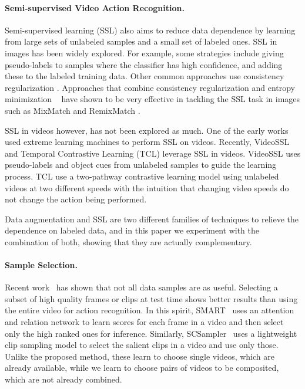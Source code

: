 \documentclass[runningheads]{llncs}
\begin{document}
 

\paragraph{Semi-supervised Video Action Recognition.} Semi-supervised learning (SSL) also aims to reduce data dependence by learning from large sets of unlabeled samples and a small set of labeled ones. SSL in images has been widely explored.
For example, some strategies include giving pseudo-labels \cite{arazo2020pseudo,pseudo} to samples where the classifier has high confidence, and adding these to the labeled training data. Other common approaches use consistency regularization \cite{conreg1,conreg2,meanteacher}. Approaches that combine consistency regularization and entropy minimization ~\cite{grandvalet2005semi} have shown to be very effective in tackling the SSL task in images such as MixMatch \cite{berthelot2019mixmatch} and RemixMatch \cite{berthelot2019remixmatch}.

SSL in videos however, has not been explored as much. One of the early works used extreme learning machines \cite{iosifidis2014semi} to perform SSL on videos. Recently, VideoSSL \cite{Jing_2021_WACV} and Temporal Contrastive Learning (TCL) \cite{tcl} leverage SSL in videos. VideoSSL \cite{Jing_2021_WACV} uses pseudo-labels and object cues from unlabeled samples to guide the learning process. TCL \cite{tcl} use a two-pathway contrastive learning model using unlabeled videos at two different speeds with the intuition that changing video speeds do not change the action being performed.

Data augmentation and SSL are two different families of techniques to relieve the dependence on labeled data, and in this paper we experiment with the combination of both, showing that they are actually complementary. 







\paragraph{Sample Selection.}
Recent work~\cite{whatmakes} has shown that not all data samples are as useful. Selecting a subset of high quality frames or clips at test time shows better results than using the entire video for action recognition. In this spirit, SMART~\cite{smart} uses an attention and relation network to learn scores for each frame in a video and then select only the high ranked ones for inference. Similarly, SCSampler~\cite{korbar2019scsampler} uses a lightweight clip sampling model to select the salient clips in a video and use only those. Unlike the proposed method, these learn to choose single videos, which are already available, while we learn to choose pairs of videos to be composited, which are not already combined. 
\end{document}
